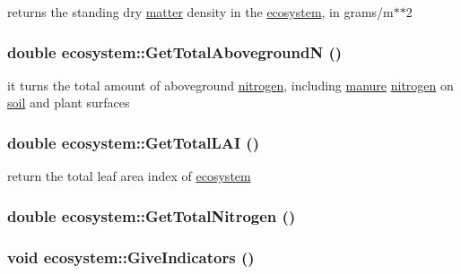 returns the standing dry \hyperlink{classmatter}{matter} density in the \hyperlink{classecosystem}{ecosystem}, in grams/m$\ast$$\ast$2 \hypertarget{classecosystem_a77d52404322e889afa3ba3f877e6c688}{
\subsubsection[{GetTotalAbovegroundN}]{\setlength{\rightskip}{0pt plus 5cm}double ecosystem::GetTotalAbovegroundN ()}}
\label{classecosystem_a77d52404322e889afa3ba3f877e6c688}


it turns the total amount of aboveground \hyperlink{classnitrogen}{nitrogen}, including \hyperlink{classmanure}{manure} \hyperlink{classnitrogen}{nitrogen} on \hyperlink{classsoil}{soil} and plant surfaces \hypertarget{classecosystem_a8aadfc5e6b887347617e3b7e73ced238}{
\subsubsection[{GetTotalLAI}]{\setlength{\rightskip}{0pt plus 5cm}double ecosystem::GetTotalLAI ()}}
\label{classecosystem_a8aadfc5e6b887347617e3b7e73ced238}


return the total leaf area index of \hyperlink{classecosystem}{ecosystem} \hypertarget{classecosystem_a3bc724205cfe7821bb4cbf468b339d9c}{
\subsubsection[{GetTotalNitrogen}]{\setlength{\rightskip}{0pt plus 5cm}double ecosystem::GetTotalNitrogen ()}}
\label{classecosystem_a3bc724205cfe7821bb4cbf468b339d9c}
\hypertarget{classecosystem_a2765e63a5da7ecd965342068e69bd10c}{
\subsubsection[{GiveIndicators}]{\setlength{\rightskip}{0pt plus 5cm}void ecosystem::GiveIndicators ()}}
\label{classecosystem_a2765e63a5da7ecd965342068e69bd10c}


